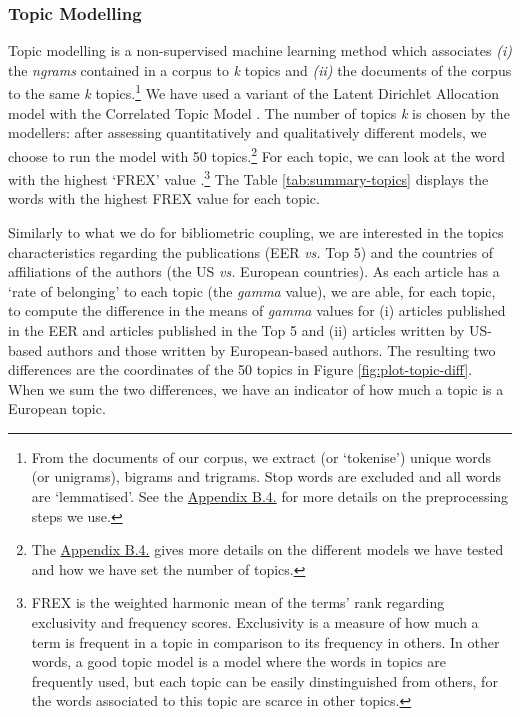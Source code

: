 \documentclass[]{elsarticle} %
\begin{document}
\hypertarget{topic-modelling}{%
\subsubsection{Topic Modelling}\label{topic-modelling}}

Topic modelling is a non-supervised machine learning method which
associates \emph{(i)} the \emph{ngrams} contained in a corpus to
\emph{k} topics and \emph{(ii)} the documents of the corpus to the same
\emph{k} topics.\footnote{From the documents of our corpus, we extract
  (or `tokenise') unique words (or unigrams), bigrams and trigrams. Stop
  words are excluded and all words are `lemmatised'. See the
  \protect\hyperlink{topic}{Appendix B.4.} for more details on the
  preprocessing steps we use.} We have used a variant of the Latent
Dirichlet Allocation model with the Correlated Topic Model
\citep{blei2007}. The number of topics \emph{k} is chosen by the
modellers: after assessing quantitatively and qualitatively different
models, we choose to run the model with 50 topics.\footnote{The
  \protect\hyperlink{topic}{Appendix B.4.} gives more details on the
  different models we have tested and how we have set the number of
  topics.} For each topic, we can look at the word with the highest
`FREX' value \citep{bischof2012}.\footnote{FREX is the weighted harmonic
  mean of the terms' rank regarding exclusivity and frequency scores.
  Exclusivity is a measure of how much a term is frequent in a topic in
  comparison to its frequency in others. In other words, a good topic
  model is a model where the words in topics are frequently used, but
  each topic can be easily dinstinguished from others, for the words
  associated to this topic are scarce in other topics.} The Table
\ref{tab:summary-topics} displays the words with the highest FREX value
for each topic.

Similarly to what we do for bibliometric coupling, we are interested in
the topics characteristics regarding the publications (EER \emph{vs.}
Top 5) and the countries of affiliations of the authors (the US
\emph{vs.} European countries). As each article has a `rate of
belonging' to each topic (the \emph{gamma} value), we are able, for each
topic, to compute the difference in the means of \emph{gamma} values for
(i) articles published in the EER and articles published in the Top 5
and (ii) articles written by US-based authors and those written by
European-based authors. The resulting two differences are the
coordinates of the 50 topics in Figure \ref{fig:plot-topic-diff}. When
we sum the two differences, we have an indicator of how much a topic is
a European topic.
\end{document}
